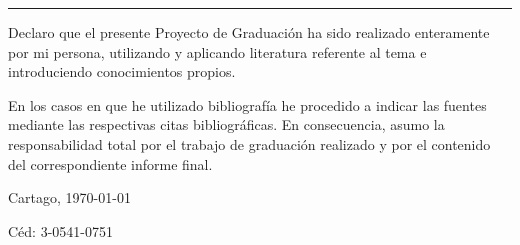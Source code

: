 \thispagestyle{empty}

\rule{10mm}{0pt}

\vfill

Declaro que el presente Proyecto de Graduación ha sido realizado enteramente
por mi persona, utilizando y aplicando literatura referente al tema e
introduciendo conocimientos propios.

En los casos en que he utilizado bibliografía he procedido a indicar las
fuentes mediante las respectivas citas bibliográficas.  En consecuencia,
asumo la responsabilidad total por el trabajo de graduación realizado y por
el contenido del correspondiente informe final.



\vspace*{8mm}

\begin{flushright}
  \scriptAuthor\par
  Cartago, \today\par
  Céd: 3-0541-0751
\end{flushright}

\cleardoublepage

